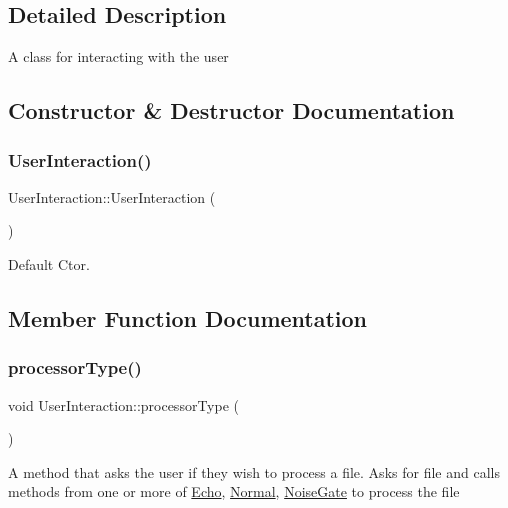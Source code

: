 \subsection{Detailed Description}
A class for interacting with the user 

\subsection{Constructor \& Destructor Documentation}
\mbox{\label{classUserInteraction_a7e2132169f69dffcbd9a4f178054c917}} 
\subsubsection{\texorpdfstring{User\+Interaction()}{UserInteraction()}}
{\footnotesize\ttfamily User\+Interaction\+::\+User\+Interaction (\begin{DoxyParamCaption}{ }\end{DoxyParamCaption})}

Default Ctor. 

\subsection{Member Function Documentation}
\mbox{\label{classUserInteraction_a3b1ea7fb9056d2fcada684ff115220f3}} 
\subsubsection{\texorpdfstring{processor\+Type()}{processorType()}}
{\footnotesize\ttfamily void User\+Interaction\+::processor\+Type (\begin{DoxyParamCaption}{ }\end{DoxyParamCaption})}

A method that asks the user if they wish to process a file. Asks for file and calls methods from one or more of \hyperlink{classEcho}{Echo}, \hyperlink{classNormal}{Normal}, \hyperlink{classNoiseGate}{Noise\+Gate} to process the file \mbox{\label{classUserInteraction_aae3cb625928ae673c47f917650dcb335}} 
